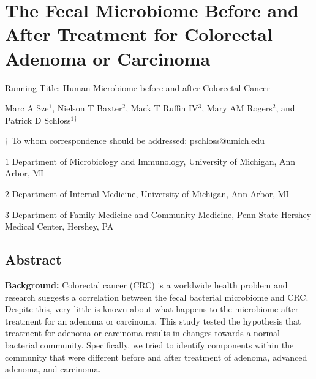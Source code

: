 \documentclass[12pt,]{article}
\title{}
\author{}
\date{}
\begin{document}
\section{The Fecal Microbiome Before and After Treatment for Colorectal
Adenoma or
Carcinoma}\label{the-fecal-microbiome-before-and-after-treatment-for-colorectal-adenoma-or-carcinoma}

\vspace{25mm}

\begin{center}
Running Title: Human Microbiome before and after Colorectal Cancer

\vspace{10mm}

Marc A Sze${^1}$, Nielson T Baxter${^2}$, Mack T Ruffin IV${^3}$, Mary AM Rogers${^2}$, and Patrick D Schloss${^1}$${^\dagger}$

\vspace{20mm}

$\dagger$ To whom correspondence should be addressed: pschloss@umich.edu

$1$ Department of Microbiology and Immunology, University of Michigan, Ann Arbor, MI

$2$ Department of Internal Medicine, University of Michigan, Ann Arbor, MI   

$3$ Department of Family Medicine and Community Medicine, Penn State Hershey Medical Center, Hershey, PA    


\end{center}

\newpage

\linenumbers

\subsection{Abstract}\label{abstract}

\textbf{Background:} Colorectal cancer (CRC) is a worldwide health
problem and research suggests a correlation between the fecal bacterial
microbiome and CRC. Despite this, very little is known about what
happens to the microbiome after treatment for an adenoma or carcinoma.
This study tested the hypothesis that treatment for adenoma or carcinoma
results in changes towards a normal bacterial community. Specifically,
we tried to identify components within the community that were different
before and after treatment of adenoma, advanced adenoma, and carcinoma.
\end{document}
